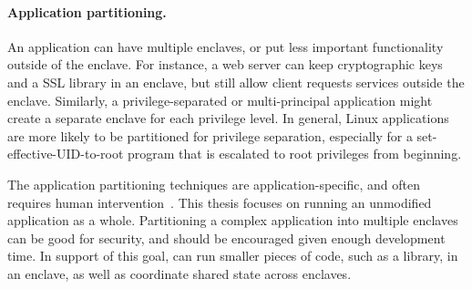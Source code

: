 \paragraph{Application partitioning.} An application can have multiple enclaves, or put less important functionality outside of the enclave.
For instance, a web server can keep cryptographic keys and a SSL library in an enclave,
but still allow client requests services
outside the enclave.
Similarly, a privilege-separated or multi-principal application might create a separate enclave for
each privilege level.
In general, Linux applications are more likely to be partitioned
for privilege separation,
especially for a set-effective-UID-to-root program that is escalated to root privileges from beginning.


The application partitioning techniques
are application-specific, and often requires human intervention~\cite{glamdring}.
This thesis focuses on running an unmodified application
as a whole.
Partitioning a complex application into multiple enclaves
can be good for security, and should be encouraged given enough development time.
In support of this goal,
\graphenesgx{} can run smaller pieces of code, such as a library, in an enclave, as well as
coordinate shared state across enclaves.



\begin{comment}
\fixmedp{Did a first cut at 2.2; needs to integrate the figure (or drop it).  I didn't know what to write for 2.3 yet.  I left the old text below for now (if there is anything you really want to save), but it needs to go away}

\papersubsection{Open Challenges}

\fixmedp{Here, I would give a taste of some of the issues we solve and why they are hard, like dynamic loading (and maybe fork or IPC).  Keep it short, a few paragraphs.}
\end{comment}



